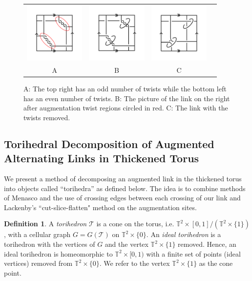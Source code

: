 \documentclass[11pt]{amsart}
\newcommand{\torus}{{\mathbb{T}^2}}
\newcommand{\sT}{{\mathcal{T}}}
\theoremstyle{plain}
\theoremstyle{definition}
\newtheorem{define}[theorem]{Definition}
\begin{document}
\begin{figure}
\centering
\begin{tabular}{cccc}
\includegraphics[width=3cm]{fig1}&
\includegraphics[width=3cm]{twist-augment}&
\includegraphics[width=3cm]{fig-2}\\
A&B&C
\end{tabular}
	 \caption{A: The top right has an odd number of twists while the bottom left has
	 an even number of twists. B: The picture of the link on the right after
	 augmentation twist regions circled in red. C: The link with the twists
	 removed.}
\label{fig:Augmentations}
\end{figure}

\subsection{Torihedral Decomposition of Augmented Alternating Links in Thickened Torus}


We present a method of decomposing an augmented link in the thickened torus into
objects called ``torihedra'' as defined below. The idea is to combine methods of Menasco
\cite{Menasco} and the use of crossing edges between each crossing of our link
and Lackenby's ``cut-slice-flatten" method \cite{lackenby} on the augmentation
sites.   


\begin{define}\cite{CKP2}
\label{def:torihedron}
A \emph{torihedron} $\sT$ is a cone on the torus, 
i.e. $\torus \times [0,1]/(\torus \times \{1\})$, with a cellular graph
$G = G(\sT)$ on $\torus \times \{0\}$.
An \emph{ideal torihedron} is a torihedron with the
vertices of $G$ and the vertex $\torus \times \{1\}$ removed. Hence, an ideal
torihedron is homeomorphic to $\torus \times [0,1)$ with a finite set of points
(ideal vertices) removed from $\torus \times \{0\}$.
We refer to the vertex $\torus \times \{1\}$ as the cone point.
\end{define}
\end{document}
